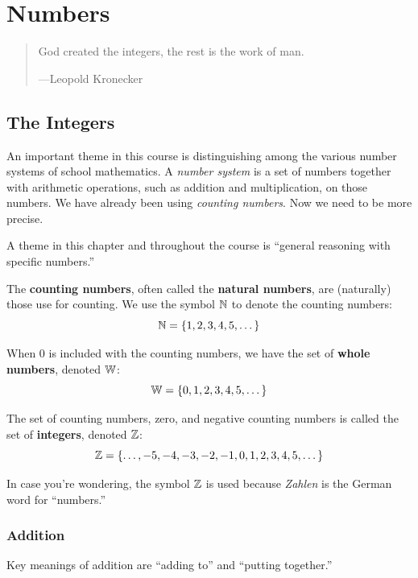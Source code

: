 \chapter{Numbers}

\begin{quote}
God created the integers, the rest is the work of man.

\hfill---Leopold Kronecker 
\end{quote}

\section{The Integers}
An important theme in this course is distinguishing among the various number systems of school mathematics.  A \emph{number system} is a set of numbers together with arithmetic operations, such as addition and multiplication, on those numbers.  We have already been using \textit{counting numbers}.  Now we need to be more precise.  

\begin{teachingnote}
A theme in this chapter and throughout the course is ``general reasoning with specific numbers.''
\end{teachingnote}

\begin{definition}
The \textbf{counting numbers}, often called the \textbf{natural numbers}, are (naturally) those use for counting.  We use the symbol $\mathbb N$ to denote the counting numbers:  
\[
\mathbb N = \{1, 2, 3, 4, 5, \dots\}
\]

When $0$ is included with the counting numbers, we have the set of \textbf{whole numbers}, denoted $\mathbb W$:  
\[
\mathbb W = \{0, 1, 2, 3, 4, 5, \dots\}
\]

The set of counting numbers, zero, and negative counting numbers is called
the set of \textbf{integers}, denoted $\mathbb Z$:
\[
\mathbb Z = \{\dots, -5,-4,-3,-2,-1,0,1,2,3,4,5,\dots \}
\]
\end{definition}

In case you're wondering, the symbol $\mathbb Z$ is used because
\textit{Zahlen} is the German word for ``numbers.'' 

\subsection{Addition}
\begin{teachingnote}
Key meanings of addition are ``adding to'' and ``putting together.''
\end{teachingnote}

